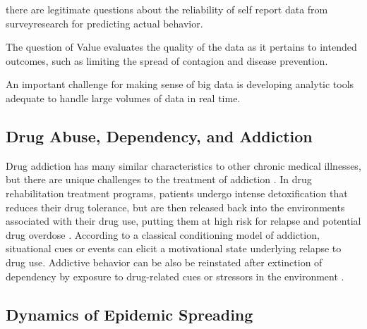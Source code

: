 \documentclass[sigconf]{acmart}
\begin{document}
there are legitimate questions about the reliability of self report data from 
surveyresearch for predicting actual behavior. 

The question of Value evaluates the quality of the data as it pertains to 
intended outcomes, such as limiting the spread of contagion and disease 
prevention. 

An important challenge for making sense of big data is developing analytic 
tools adequate to handle large volumes of data in real time.

\subsection{Drug Abuse, Dependency, and Addiction}

Drug addiction has many similar characteristics to other chronic medical 
illnesses, but there are unique challenges to the treatment of addiction
\cite{marsch12, swendson16}. In drug rehabilitation treatment programs, 
patients undergo intense detoxification that reduces their drug tolerance, but 
are then released back into the environments associated with their drug use, 
putting them at high risk for relapse and potential drug overdose 
\cite{johnson11}. According to a classical conditioning model of addiction, 
situational cues or events can elicit a motivational state underlying relapse 
to drug use. Addictive behavior can be also be reinstated after extinction of 
dependency by exposure to drug-related cues or stressors in the environment 
\cite{shaham03}. 


\subsection{Dynamics of Epidemic Spreading}
\end{document}
